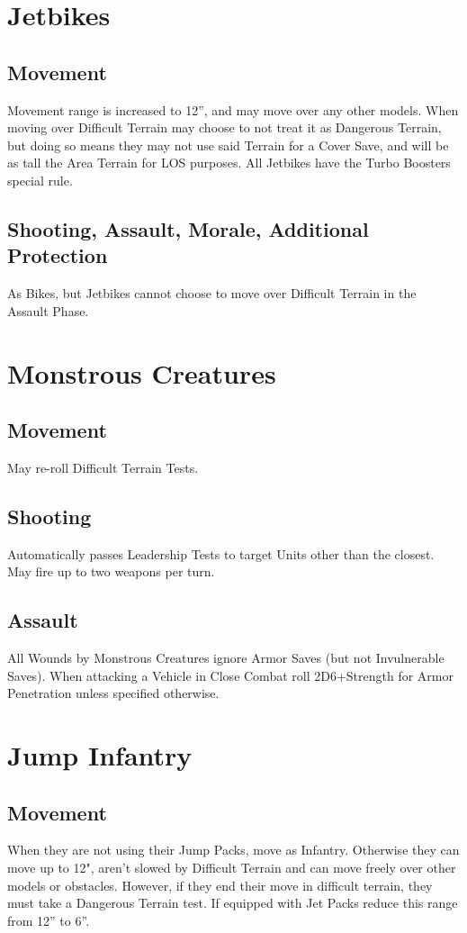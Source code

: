 \section{Jetbikes}
\subsection{Movement}
Movement range is increased to 12”, and may move over any
other models. When moving over Difficult Terrain may choose
to not treat it as Dangerous Terrain, but doing so means they
may not use said Terrain for a Cover Save, and will be as tall
the Area Terrain for LOS purposes. All Jetbikes have the Turbo
Boosters special rule.
\subsection{Shooting, Assault, Morale, Additional Protection}
As Bikes, but Jetbikes cannot choose to move over Difficult
Terrain in the Assault Phase.
\section{Monstrous Creatures}
\subsection{Movement}
May re-roll Difficult Terrain Tests.
\subsection{Shooting}
Automatically passes Leadership Tests to target Units other
than the closest. May fire up to two weapons per turn.
\subsection{Assault}
All Wounds by Monstrous Creatures ignore Armor Saves (but
not Invulnerable Saves). When attacking a Vehicle in Close
Combat roll 2D6+Strength for Armor Penetration unless
specified otherwise.

\section{Jump Infantry}
\subsection{Movement}
When they are not using their Jump Packs, move as Infantry.
Otherwise they can move up to 12", aren't slowed by Difficult
Terrain and can move freely over other models or obstacles.
However, if they end their move in difficult terrain, they must
take a Dangerous Terrain test. If equipped with Jet Packs
reduce this range from 12” to 6”.
